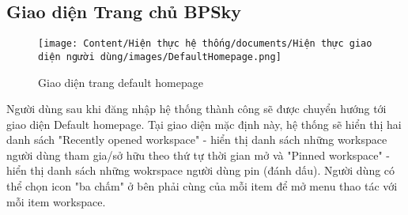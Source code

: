 \subsection{Giao diện Trang chủ BPSky}

\begin{figure}[H]
    \centering
    \texttt{[image: Content/Hiện thực hệ thống/documents/Hiện thực giao diện người dùng/images/DefaultHomepage.png]}
    \vspace{0.5cm}
    \caption{Giao diện trang default homepage}
    \label{fig: Giao diện trang default homepage}
\end{figure}

Người dùng sau khi đăng nhập hệ thống thành công sẽ được chuyển hướng tới giao diện Default homepage. Tại giao diện mặc định này, hệ thống sẽ hiển thị hai danh sách "Recently opened workspace" - hiển thị danh sách những workspace người dùng tham gia/sở hữu theo thứ tự thời gian mở và "Pinned workspace" - hiển thị danh sách những wokrspace người dùng pin (đánh dấu). Người dùng có thể chọn icon "ba chấm" ở bên phải cùng của mỗi item để mở menu thao tác với mỗi item workspace.